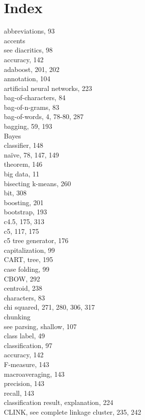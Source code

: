 \documentclass[10pt]{book}
\begin{document}
\section*{Index}
abbreviations, 93\\
accents\\
see diacritics, 98\\
accuracy, 142\\
adaboost, 201, 202\\
annotation, 104\\
artificial neural networks, 223\\
bag-of-characters, 84\\
bag-of-n-grams, 83\\
bag-of-words, 4, 78-80, 287\\
bagging, 59, 193\\
Bayes\\
classifier, 148\\
naïve, 78, 147, 149\\
theorem, 146\\
big data, 11\\
bisecting k-means, 260\\
bit, 308\\
boosting, 201\\
bootstrap, 193\\
c4.5, 175, 313\\
c5, 117, 175\\
c5 tree generator, 176\\
capitalization, 99\\
CART, tree, 195\\
case folding, 99\\
CBOW, 292\\
centroid, 238\\
characters, 83\\
chi squared, 271, 280, 306, 317\\
chunking\\
see parsing, shallow, 107\\
class label, 49\\
classification, 97\\
accuracy, 142\\
F-measure, 143\\
macroaveraging, 143\\
precision, 143\\
recall, 143\\
classification result, explanation, 224\\
CLINK, see complete linkage cluster, 235, 242\\
\end{document}
